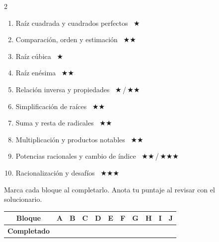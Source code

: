 \documentclass[11pt, letterpaper]{article}
\begin{document}
\medskip

\begin{tcolorbox}[answerbox, title={Índice de Bloques}]
\begin{multicols}{2}
\begin{enumerate}[label=\textbf{\Alph*.}, leftmargin=*, itemsep=5pt]
  \item Raíz cuadrada y cuadrados perfectos \dotfill\ $\bigstar$
  \item Comparación, orden y estimación \dotfill\ $\bigstar\bigstar$
  \item Raíz cúbica \dotfill\ $\bigstar$
  \item Raíz enésima \dotfill\ $\bigstar\bigstar$
  \item Relación inversa y propiedades \dotfill\ $\bigstar$\,/\,$\bigstar\bigstar$
  \item Simplificación de raíces \dotfill\ $\bigstar\bigstar$
  \item Suma y resta de radicales \dotfill\ $\bigstar\bigstar$
  \item Multiplicación y productos notables \dotfill\ $\bigstar\bigstar$
  \item Potencias racionales y cambio de índice \dotfill\ $\bigstar\bigstar$\,/\,$\bigstar\bigstar\bigstar$
  \item Racionalización y desafíos \dotfill\ $\bigstar\bigstar\bigstar$
\end{enumerate}
\end{multicols}
\end{tcolorbox}

\medskip

\begin{tcolorbox}[importantbox, title={Mi registro de progreso}]
Marca cada bloque al completarlo. Anota tu puntaje al revisar con el solucionario.

\vspace{6pt}
\begin{center}
\renewcommand{\arraystretch}{1.6}
\begin{tabular}{|c|c|c|c|c|c|c|c|c|c|c|}
\hline
\textbf{Bloque} & \textbf{A} & \textbf{B} & \textbf{C} & \textbf{D} & \textbf{E} & \textbf{F} & \textbf{G} & \textbf{H} & \textbf{I} & \textbf{J}\\
\hline
\textbf{Completado} & & & & & & & & & & \\
\hline
\end{tabular}
\end{center}
\end{tcolorbox}
\end{document}
